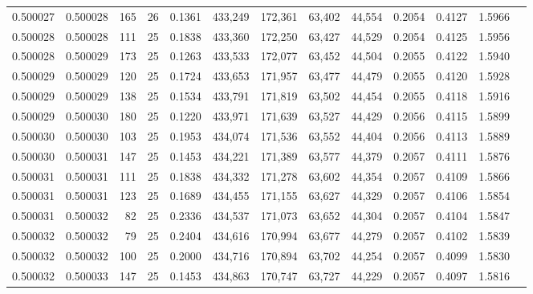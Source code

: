 \begin{tabular}{rrrrrrrrrrrrr}
0.500027 & 0.500028 & 165 &  26 &                                     0.1361 & 433,249 & 172,361 &  63,402 &  44,554 & 0.2054 & 0.4127 & 1.5966 \\
0.500028 & 0.500028 & 111 &  25 &                                     0.1838 & 433,360 & 172,250 &  63,427 &  44,529 & 0.2054 & 0.4125 & 1.5956 \\
0.500028 & 0.500029 & 173 &  25 &                                     0.1263 & 433,533 & 172,077 &  63,452 &  44,504 & 0.2055 & 0.4122 & 1.5940 \\
0.500029 & 0.500029 & 120 &  25 &                                     0.1724 & 433,653 & 171,957 &  63,477 &  44,479 & 0.2055 & 0.4120 & 1.5928 \\
0.500029 & 0.500029 & 138 &  25 &                                     0.1534 & 433,791 & 171,819 &  63,502 &  44,454 & 0.2055 & 0.4118 & 1.5916 \\
0.500029 & 0.500030 & 180 &  25 &                                     0.1220 & 433,971 & 171,639 &  63,527 &  44,429 & 0.2056 & 0.4115 & 1.5899 \\
0.500030 & 0.500030 & 103 &  25 &                                     0.1953 & 434,074 & 171,536 &  63,552 &  44,404 & 0.2056 & 0.4113 & 1.5889 \\
0.500030 & 0.500031 & 147 &  25 &                                     0.1453 & 434,221 & 171,389 &  63,577 &  44,379 & 0.2057 & 0.4111 & 1.5876 \\
0.500031 & 0.500031 & 111 &  25 &                                     0.1838 & 434,332 & 171,278 &  63,602 &  44,354 & 0.2057 & 0.4109 & 1.5866 \\
0.500031 & 0.500031 & 123 &  25 &                                     0.1689 & 434,455 & 171,155 &  63,627 &  44,329 & 0.2057 & 0.4106 & 1.5854 \\
0.500031 & 0.500032 &  82 &  25 &                                     0.2336 & 434,537 & 171,073 &  63,652 &  44,304 & 0.2057 & 0.4104 & 1.5847 \\
0.500032 & 0.500032 &  79 &  25 &                                     0.2404 & 434,616 & 170,994 &  63,677 &  44,279 & 0.2057 & 0.4102 & 1.5839 \\
0.500032 & 0.500032 & 100 &  25 &                                     0.2000 & 434,716 & 170,894 &  63,702 &  44,254 & 0.2057 & 0.4099 & 1.5830 \\
0.500032 & 0.500033 & 147 &  25 &                                     0.1453 & 434,863 & 170,747 &  63,727 &  44,229 & 0.2057 & 0.4097 & 1.5816 \\

\end{tabular}
